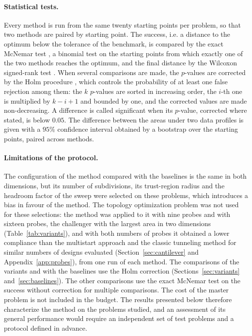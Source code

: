 \documentclass[pdflatex,sn-basic]{sn-jnl}
\begin{document}
\paragraph{Statistical tests.} Every method is run from the same twenty starting
points per problem, so that two methods are paired by starting point. The
success, i.e. a distance to the optimum below the tolerance of the benchmark, is
compared by the exact McNemar test \citep{mcnemar1947}, a binomial test on the
starting points from which exactly one of the two methods reaches the optimum,
and the final distance by the Wilcoxon signed-rank test \citep{wilcoxon1945}.
When several comparisons are made, the $p$-values are corrected by the Holm
procedure \citep{holm1979}, which controls the probability of at least one false
rejection among them: the $k$ $p$-values are sorted in increasing order, the
$i$-th one is multiplied by $k - i + 1$ and bounded by one, and the corrected
values are made non-decreasing. A difference is called significant when its $p$-value, corrected
where stated, is below $0.05$. The difference between the areas under two data
profiles is given with a $95\%$ confidence interval obtained by a bootstrap
\citep{efron1979} over the starting points, paired across methods.

\paragraph{Limitations of the protocol.} The configuration of the method compared
with the baselines is the same in both dimensions, but its number of
subdivisions, its trust-region radius and the headroom factor of the sweep were
selected on these problems, which introduces a bias in favour of the method. The topology optimization problem
was not used for these selections: the method was applied to it with nine
probes and with sixteen probes, the challenger with the largest area in two
dimensions (Table~\ref{tab:variants}), and with both numbers of probes it
obtained a lower compliance than the multistart approach and the classic
tunneling method for similar numbers of designs evaluated
(Section~\ref{sec:cantilever} and Appendix~\ref{app:probes}), from one run of
each method. The comparisons of the variants and
with the baselines use the Holm correction
(Sections~\ref{sec:variants} and~\ref{sec:baselines}). The other comparisons use
the exact McNemar test on the success without correction for multiple
comparisons. The cost of
the master problem is not included in the budget. The results presented below therefore
characterize the method on the problems studied, and an assessment of its general
performance would require an independent set of test problems and a protocol
defined in advance.
\end{document}
